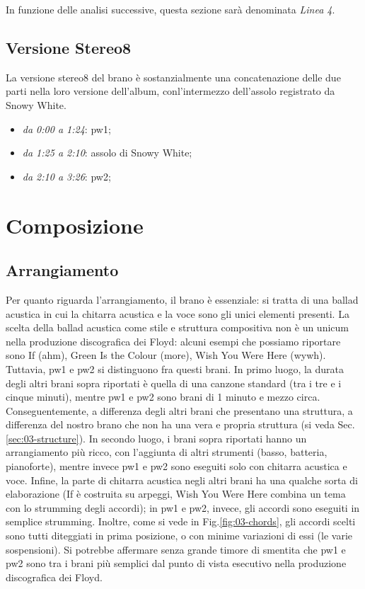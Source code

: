 \documentclass[class=book, crop=false, oneside, 12pt]{standalone}
\begin{document}
    In funzione delle analisi successive, questa sezione sarà denominata \emph{Linea 4}.

    \subsection{Versione Stereo8}
    La versione stereo8 del brano è sostanzialmente una concatenazione delle due parti nella loro versione dell'album, conl'intermezzo dell'assolo registrato da Snowy White. 

    \begin{itemize}
        \item \emph{da 0:00 a 1:24}: \acrlong{pw1};
        \item \emph{da 1:25 a 2:10}: assolo di Snowy White;
        \item \emph{da 2:10 a 3:26}: \acrlong{pw2};
    \end{itemize}

    \section{Composizione}
    \label{sec:03-arrangement}

    \subsection{Arrangiamento}
    Per quanto riguarda l'arrangiamento, il brano è essenziale: si tratta di una ballad acustica in cui la chitarra acustica e la voce sono gli unici elementi presenti. La scelta della ballad acustica come stile e struttura compositiva non è un unicum nella produzione discografica dei Floyd: alcuni esempi che possiamo riportare sono If (\acrshort{ahm}), Green Is the Colour (\acrshort{more}), Wish You Were Here (\acrshort{wywh}). Tuttavia, \acrshort{pw1} e \acrshort{pw2} si distinguono fra questi brani. In primo luogo, la durata degli altri brani sopra riportati è quella di una canzone standard (tra i tre e i cinque minuti), mentre \acrshort{pw1} e \acrshort{pw2} sono brani di 1 minuto e mezzo circa. Conseguentemente, a differenza  degli altri brani che presentano una struttura, a differenza del nostro brano che non ha una vera e propria struttura (si veda Sec.\ref{sec:03-structure}). In secondo luogo, i brani sopra riportati hanno un arrangiamento più ricco, con l'aggiunta di altri strumenti (basso, batteria, pianoforte), mentre invece \acrshort{pw1} e \acrshort{pw2} sono eseguiti solo con chitarra acustica e voce. Infine, la parte di chitarra acustica negli altri brani ha una qualche sorta di elaborazione (If è costruita su arpeggi, Wish You Were Here combina un tema con lo strumming degli accordi); in \acrshort{pw1} e \acrshort{pw2}, invece, gli accordi sono eseguiti in semplice strumming. Inoltre, come si vede in Fig.\ref{fig:03-chords}, gli accordi scelti sono tutti diteggiati in prima posizione, o con minime variazioni di essi (le varie sospensioni). Si potrebbe affermare senza grande timore di smentita che \acrshort{pw1} e \acrshort{pw2} sono tra i brani più semplici dal punto di vista esecutivo nella produzione discografica dei Floyd.
    
\end{document}
